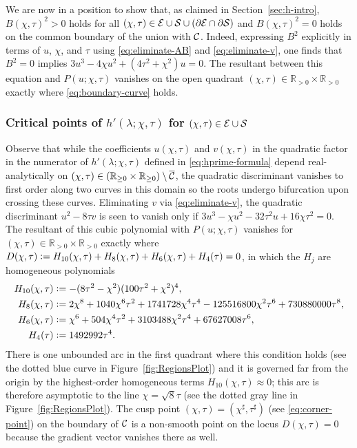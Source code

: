 We are now in a position to show that, as claimed in Section~\ref{sec:h-intro}, $B(\chi,\tau)^2>0$ holds for all $(\chi,\tau)\in\mathcal{E}\cup\mathcal{S}\cup(\partial\mathcal{E}\cap\partial\mathcal{S})$ and $B(\chi,\tau)^2=0$ holds on the common boundary of the union with $\mathcal{C}$. 
Indeed,
expressing $B^2$ explicitly in terms of $u$, $\chi$, and $\tau$ using \eqref{eq:eliminate-AB} and \eqref{eq:eliminate-v}, one finds that $B^2=0$ implies $3u^3-4\chi u^2+(4\tau^2+\chi^2) u=0$.  The resultant between this equation and $P(u;\chi,\tau)$ vanishes on the open quadrant $(\chi,\tau)\in\mathbb{R}_{>0}\times\mathbb{R}_{>0}$ exactly where \eqref{eq:boundary-curve} holds.  



\subsubsection{Critical points of $h'(\lambda;\chi,\tau)$ for $(\chi,\tau)\in\mathcal{E}\cup\mathcal{S}$}
\label{sec:critical-points}
Observe that while the coefficients $u(\chi,\tau)$ and $v(\chi,\tau)$ in the quadratic factor in the numerator of $h'(\lambda;\chi,\tau)$ defined in \eqref{eq:hprime-formula} depend real-analytically on $(\chi,\tau)\in (\mathbb{R}_{\ge 0}\times\mathbb{R}_{\ge 0})\setminus\overline{\mathcal{C}}$, the quadratic discriminant vanishes to first order along two curves in this domain so the roots undergo bifurcation upon crossing these curves.  Eliminating $v$ via \eqref{eq:eliminate-v}, the quadratic discriminant $u^2-8\tau v$ is seen to vanish only if $3u^3-\chi u^2-32\tau^2 u+16\chi\tau^2=0$.  The resultant of this cubic polynomial with $P(u;\chi,\tau)$ vanishes for $(\chi,\tau)\in\mathbb{R}_{>0}\times\mathbb{R}_{>0}$ exactly where $D(\chi,\tau)\vcentcolon= H_{10}(\chi,\tau)+H_8(\chi,\tau)+H_6(\chi,\tau) + H_4(\tau)=0$, in which the $H_j$ are homogeneous polynomials
\begin{equation}
\begin{split}
H_{10}(\chi,\tau)&\vcentcolon= -(8\tau^2-\chi^2)(100\tau^2+\chi^2)^4,\\
H_8(\chi,\tau)&\vcentcolon= 2\chi^8+1040\chi^6\tau^2+1741728\chi^4\tau^4-125516800\chi^2\tau^6+730880000\tau^8,\\
H_6(\chi,\tau)&\vcentcolon= \chi^6+504\chi^4\tau^2+3103488\chi^2\tau^4+67627008\tau^6,\\
H_4(\tau)&\vcentcolon= 1492992\tau^4.
\end{split}
\label{eq:H-polynomials}
\end{equation}
There is one unbounded arc in the first quadrant where this condition holds (see the dotted blue curve in Figure~\ref{fig:RegionsPlot}) and it is governed far from the origin by the highest-order homogeneous terms $H_{10}(\chi,\tau)\approx 0$; this arc is therefore asymptotic to the line $\chi=\sqrt{8}\tau$ (see the dotted gray line in Figure~\ref{fig:RegionsPlot}).  The cusp point $(\chi,\tau)=(\chi^\sharp,\tau^\sharp)$ (see \eqref{eq:corner-point}) on the boundary of $\mathcal{C}$ is a non-smooth point on the locus $D(\chi,\tau)=0$ because the gradient vector vanishes there as well.  
